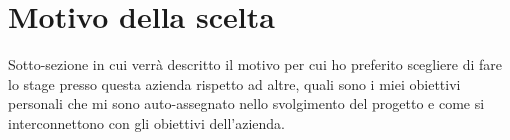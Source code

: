 \section{Motivo della scelta}

Sotto-sezione in cui verrà descritto il motivo per cui ho preferito scegliere di fare lo stage presso questa azienda rispetto ad altre, quali sono i miei obiettivi personali che mi sono auto-assegnato nello svolgimento del progetto e come si interconnettono con gli obiettivi dell'azienda.